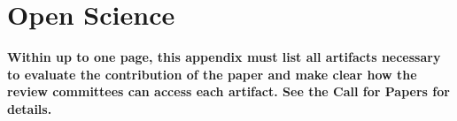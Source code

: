 \section*{Open Science}
\textbf{Within up to one page, this appendix must list all artifacts necessary to evaluate the contribution of the paper and make clear how the review committees can access each artifact. See the Call for Papers for details.}
\cleardoublepage






